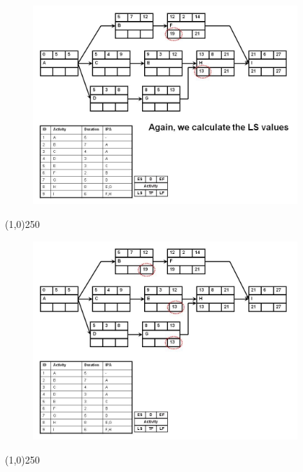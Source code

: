 \begin{frame}
\begin{figure}
	\centering
		\includegraphics[width = 10.0cm]{oldnotes/Slide154.jpg}
\end{figure}
\end{frame}
\begin{center}\line(1,0){250}\end{center}




\begin{frame}
\begin{figure}
	\centering
		\includegraphics[width = 10.0cm]{oldnotes/Slide155.jpg}
\end{figure}
\end{frame}
\begin{center}\line(1,0){250}\end{center}




